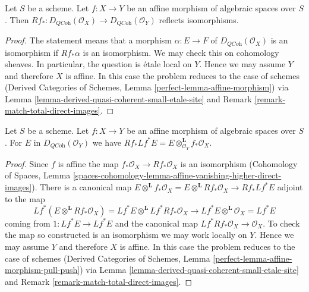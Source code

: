 \begin{lemma}
\label{lemma-affine-morphism}
Let $S$ be a scheme. Let $f : X \to Y$ be an affine morphism of algebraic
spaces over $S$. Then
$Rf_* : D_{\textit{QCoh}}(\mathcal{O}_X) \to D_{\textit{QCoh}}(\mathcal{O}_Y)$
reflects isomorphisms.
\end{lemma}

\begin{proof}
The statement means that a morphism $\alpha : E \to F$ of
$D_{\textit{QCoh}}(\mathcal{O}_X)$ is an isomorphism if
$Rf_*\alpha$ is an isomorphism. We may check this on cohomology sheaves.
In particular, the question is \'etale local on $Y$. Hence we may assume
$Y$ and therefore $X$ is affine. In this case the problem reduces to the
case of schemes
(Derived Categories of Schemes, Lemma \ref{perfect-lemma-affine-morphism})
via Lemma \ref{lemma-derived-quasi-coherent-small-etale-site} and
Remark \ref{remark-match-total-direct-images}.
\end{proof}

\begin{lemma}
\label{lemma-affine-morphism-pull-push}
Let $S$ be a scheme. Let $f : X \to Y$ be an affine morphism of algebraic
spaces over $S$. For $E$ in $D_{\textit{QCoh}}(\mathcal{O}_Y)$ we have
$Rf_* Lf^* E = E \otimes^\mathbf{L}_{\mathcal{O}_Y} f_*\mathcal{O}_X$.
\end{lemma}

\begin{proof}
Since $f$ is affine the map $f_*\mathcal{O}_X \to Rf_*\mathcal{O}_X$
is an isomorphism (Cohomology of Spaces, Lemma
\ref{spaces-cohomology-lemma-affine-vanishing-higher-direct-images}).
There is a canonical map
$E \otimes^\mathbf{L} f_*\mathcal{O}_X =
E \otimes^\mathbf{L} Rf_*\mathcal{O}_X \to Rf_* Lf^* E$
adjoint to the map
$$
Lf^*(E \otimes^\mathbf{L} Rf_*\mathcal{O}_X) =
Lf^*E \otimes^\mathbf{L} Lf^*Rf_*\mathcal{O}_X \longrightarrow
Lf^* E \otimes^\mathbf{L} \mathcal{O}_X = Lf^* E
$$
coming from $1 : Lf^*E \to Lf^*E$ and the canonical map
$Lf^*Rf_*\mathcal{O}_X \to \mathcal{O}_X$. To check the map so constructed
is an isomorphism we may work locally on $Y$. Hence we may assume
$Y$ and therefore $X$ is affine. In this case the problem reduces to the
case of schemes
(Derived Categories of Schemes, Lemma
\ref{perfect-lemma-affine-morphism-pull-push})
via Lemma \ref{lemma-derived-quasi-coherent-small-etale-site} and
Remark \ref{remark-match-total-direct-images}.
\end{proof}






